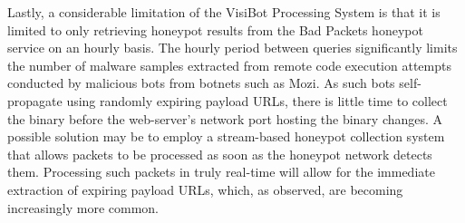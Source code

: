 Lastly, a considerable limitation of the VisiBot Processing System is that it is limited to only retrieving honeypot results from the Bad Packets \citep{BadPackets} honeypot service on an hourly basis. The hourly period between queries significantly limits the number of malware samples extracted from remote code execution attempts conducted by malicious bots from botnets such as Mozi. As such bots self-propagate using randomly expiring payload URLs, there is little time to collect the binary before the web-server's network port hosting the binary changes. A possible solution may be to employ a stream-based honeypot collection system that allows packets to be processed as soon as the honeypot network detects them. Processing such packets in truly real-time will allow for the immediate extraction of expiring payload URLs, which, as observed, are becoming increasingly more common.